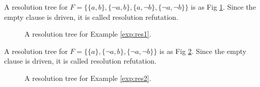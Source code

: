 \documentclass[12pt]{book}
\begin{document}
 \begin{examp}\label{exp:res1}
      A resolution tree for $F = \{\{a,b\},\{\neg a,b\},\{a, \neg b\},\{\neg a, \neg b\}\}$ is as Fig \ref{fig:resol1}. Since the empty clause 
	  is driven, it is called resolution refutation.
	   \begin{figure}
	   \centering  
	   \caption{A resolution tree for Example \ref{exp:res1}.}
	   \label{fig:resol1}
       \end{figure}
\end{examp}

\begin{examp}\label{exp:res2}
      A resolution tree for $F = \{\{a\},\{\neg a,b\},\{\neg a, \neg b\}\}$ is as Fig \ref{fig:resol2}. Since the empty clause 
	  is driven, it is called resolution refutation.
	  \begin{figure}[h]
       \centering
	   \caption{A resolution tree for Example \ref{exp:res2}.}
	   \label{fig:resol2}
       \end{figure}
\end{examp}
 
\end{document}

